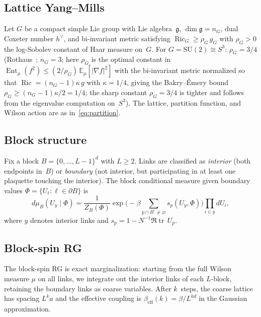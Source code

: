 \documentclass[11pt,a4paper]{article}
\theoremstyle{plain}
\theoremstyle{definition}
\theoremstyle{remark}
\newcommand{\E}{\mathbb{E}}
\newcommand{\Ent}{\operatorname{Ent}}
\newcommand{\tr}{\operatorname{tr}}
\newcommand{\Ric}{\operatorname{Ric}}
\newcommand{\SU}{\mathrm{SU}}
\newcommand{\fg}{\mathfrak{g}}
\begin{document}
\subsection{Lattice Yang--Mills}

Let $G$ be a compact simple Lie group with Lie algebra~$\fg$,
$\dim \fg = n_G$, dual Coxeter number $h^\vee$, and
bi-invariant metric satisfying $\Ric_G \geq \rho_G\,g_G$
with $\rho_G > 0$ the log-Sobolev constant of Haar
measure on~$G$.
For $G = \SU(2) \cong S^3$: $\rho_G = 3/4$
(Rothaus~\cite{Rothaus}; $n_G = 3$;
here $\rho_G$ is the optimal constant in
$\Ent_\mu(f^2) \leq (2/\rho_G)\,\E_\mu[|\nabla f|^2]$
with the bi-invariant metric normalized so that
$\Ric = (n_G - 1)\kappa\,g$ with $\kappa = 1/4$,
giving the Bakry--\'Emery bound
$\rho_G \geq (n_G - 1)\kappa/2 = 1/4$;
the sharp constant $\rho_G = 3/4$ is tighter and follows
from the eigenvalue computation on~$S^3$).
The lattice, partition function, and Wilson action are as
in~\eqref{eq:partition}.

\subsection{Block structure}

Fix a block $B = \{0, \ldots, L{-}1\}^d$ with $L \geq 2$.
Links are classified as \emph{interior} (both endpoints
in~$B$) or \emph{boundary} (not interior, but participating
in at least one plaquette touching the interior).
The block conditional measure given boundary values
$\Phi = \{U_\ell : \ell \in \partial B\}$ is
\begin{equation}\label{eq:block_cond}
  d\mu_B(U_y \mid \Phi)
  = \frac{1}{Z_B(\Phi)} \exp\!\bigl(-\beta \sum_{p \cap B^\circ
  \neq \varnothing} s_p(U_y, \Phi)\bigr) \prod_{i \in y} dU_i,
\end{equation}
where $y$ denotes interior links and
$s_p = 1 - N^{-1}\Re\tr\,U_p$.

\subsection{Block-spin RG}\label{ssec:rg}

The block-spin RG is exact marginalization: starting from the
full Wilson measure $\mu$ on all links, we integrate out the
interior links of each $L$-block, retaining the boundary links
as coarse variables.  After $k$~steps, the coarse lattice has
spacing $L^k a$ and the effective coupling is
$\beta_{\mathrm{eff}}(k) = \beta / L^{kd}$ in the Gaussian
approximation.
\end{document}
